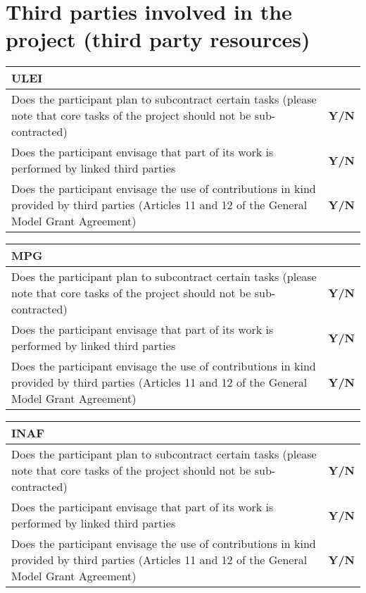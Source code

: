 \section{Third parties involved in the project (third party resources)}
\label{sec:third-parties}


\begin{tabular}{|p{}|p{}|}
  \hline  
  \multicolumn{2}{|l|}{\cellcolor[gray]{0.8}\textbf{ULEI}}\\
  \hline
  Does the participant plan to subcontract certain tasks (please note that core tasks of the project should not be sub-contracted) &
  \textbf{Y/N} \\
  \hline
Does the participant envisage that part of its work is performed by linked
third parties &
  \textbf{Y/N} \\
  \hline
  Does the participant envisage the use of contributions in kind provided by
third parties (Articles 11 and 12 of the General Model Grant Agreement) &
  \textbf{Y/N}\\
  \hline
\end{tabular}

\begin{tabular}{|p{}|p{}|}
  \hline  
  \multicolumn{2}{|l|}{\cellcolor[gray]{0.8}\textbf{MPG}}\\
  \hline
  Does the participant plan to subcontract certain tasks (please note that core tasks of the project should not be sub-contracted) &
  \textbf{Y/N} \\
  \hline
Does the participant envisage that part of its work is performed by linked
third parties &
  \textbf{Y/N} \\
  \hline
  Does the participant envisage the use of contributions in kind provided by
third parties (Articles 11 and 12 of the General Model Grant Agreement) &
  \textbf{Y/N}\\
  \hline
\end{tabular}

\begin{tabular}{|p{}|p{}|}
  \hline  
  \multicolumn{2}{|l|}{\cellcolor[gray]{0.8}\textbf{INAF}}\\
  \hline
  Does the participant plan to subcontract certain tasks (please note that core tasks of the project should not be sub-contracted) &
  \textbf{Y/N} \\
  \hline
Does the participant envisage that part of its work is performed by linked
third parties &
  \textbf{Y/N} \\
  \hline
  Does the participant envisage the use of contributions in kind provided by
third parties (Articles 11 and 12 of the General Model Grant Agreement) &
  \textbf{Y/N}\\
  \hline
\end{tabular}

